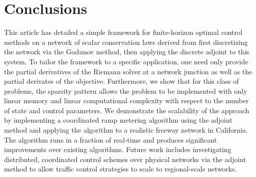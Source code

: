 \section{Conclusions\label{sec:Conclusions}}

This article has detailed a simple framework for finite-horizon optimal control methods on a network of scalar conservation laws derived from first discretizing the network via the Godunov method, then applying the discrete adjoint to this system. To tailor the framework to a specific application, one need only provide the partial derivatives of the Riemann solver at a network junction as well as the partial derivates of the objective. Furthermore, we show that for this class of problems, the sparsity pattern allows the problem to be implemented with only linear memory and linear computational complexity with respect to the number of state and control parameters. We demonstrate the scalability of the approach by implementing a coordinated ramp metering algorithm using the adjoint method and applying the algorithm to a realistic freeway network in California. The algorithm runs in a fraction of real-time and produces significant improvements over existing algorithms. Future work includes investigating distributed, coordinated control schemes over physical networks via the adjoint method to allow traffic control strategies to scale to regional-scale networks.